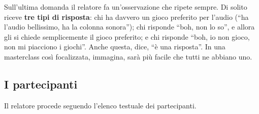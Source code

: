 Sull'ultima domanda il relatore fa un'osservazione che ripete sempre. Di solito
riceve \textbf{tre tipi di risposta}: chi ha davvero un gioco preferito per
l'audio (``ha l'audio bellissimo, ha la colonna sonora''); chi risponde ``boh,
non lo so'', e allora gli si chiede semplicemente il gioco preferito; e chi
risponde ``boh, io non gioco, non mi piacciono i giochi''. Anche questa, dice, ``è
una risposta''. In una masterclass così focalizzata, immagina, sarà più facile
che tutti ne abbiano uno.

\subsection{I partecipanti}

Il relatore procede seguendo l'elenco testuale dei partecipanti.

